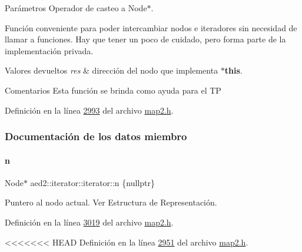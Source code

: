 \begin{DoxyParams}{\-Parámetros}
Operador de casteo a Node$\ast$. 

Función conveniente para poder intercambiar nodos e iteradores sin necesidad de llamar a funciones. Hay que tener un poco de cuidado, pero forma parte de la implementación privada.


\begin{DoxyRetVals}{Valores devueltos}
{\em res} & dirección del nodo que implementa {\bfseries $\ast$this}.\\
\hline
\end{DoxyRetVals}
\begin{DoxyRemark}{Comentarios}
Esta función se brinda como ayuda para el TP 
\end{DoxyRemark}


Definición en la línea \hyperlink{map2_8h_source_l02993}{2993} del archivo \hyperlink{map2_8h_source}{map2.\+h}.



\subsubsection{Documentación de los datos miembro}
\mbox{\label{classaed2_1_1iterator_1_1iterator_a13e1e7981af004da89fe8feecfb384da_a13e1e7981af004da89fe8feecfb384da}} 
\paragraph{\texorpdfstring{n}{n}}
{\footnotesize\ttfamily Node$\ast$ aed2\+::iterator\+::iterator\+::n \{nullptr\}\hspace{0.3cm}{\ttfamily [private]}}



Puntero al nodo actual. Ver Estructura de Representación. 



Definición en la línea \hyperlink{map2_8h_source_l03019}{3019} del archivo \hyperlink{map2_8h_source}{map2.\+h}.



<<<<<<< HEAD
\-Definición en la línea \hyperlink{map2_8h_source_l02951}{2951} del archivo \hyperlink{map2_8h_source}{map2.\-h}.

\hypertarget{classaed2_1_1iterator_1_1iterator_a8facdf09114b97042cf3d6403ba1d719_a8facdf09114b97042cf3d6403ba1d719}{
}
\end{DoxyParams}
